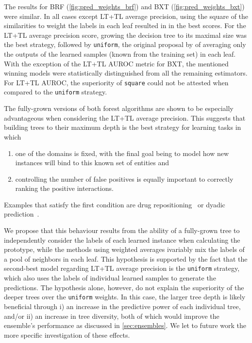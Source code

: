 
The results for BRF (\autoref{fig:pred_weights_brf}) and BXT (\autoref{fig:pred_weights_bxt}) were similar. In all cases except LT+TL average precision, using the square of the similarities to weight the labels in each leaf resulted in in the best scores. For the LT+TL average precision score, growing the decision tree to its maximal size was the best strategy, followed by \texttt{uniform}, the original proposal by \textcite{pliakos2018global} of averaging only the 
outputs of the learned samples (known from the training set) in each leaf. With the exception of the LT+TL AUROC metric for BXT, the mentioned winning models were statistically distinguished from all the remaining estimators. For LT+TL AUROC, the superiority of \texttt{square} could not be attested when compared to the \texttt{uniform} strategy.

The fully-grown versions of both forest algorithms are shown to be especially advantageous when considering the LT+TL average precision. This suggests that building trees to their maximum depth is the best strategy for learning tasks in which
%
\begin{enumerate}
    \item one of the domains is fixed, with the final goal being to model how new instances will bind to this known set of entities and
    \item controlling the number of false positives is equally important to correctly ranking the positive interactions.  %
\end{enumerate}

Examples that satisfy the first condition are drug repositioning~\cite{} or dyadic prediction~\cite{}. %

We propose that this behaviour results from the ability of a fully-grown tree to independently consider the labels of each learned instance when calculating the prototype, while the methods using weighted averages ivariably mix the labels of a pool of neighbors in each leaf. This hypothesis is supported by the fact that the second-best model regarding LT+TL average precision is the \texttt{uniform} strategy, which also uses the labels of individual learned samples to generate the predictions. The hypothesis alone, however, do not explain the superiority of the deeper trees over the \texttt{uniform} weights. In this case, the larger tree depth is likely beneficial through i) an increase in the predictive power of each individual tree, and/or ii) an increase in tree diversity, both of which would improve the ensemble's performance as discussed in \autoref{sec:ensembles}. We let to future work the more specific investigation of these effects.

